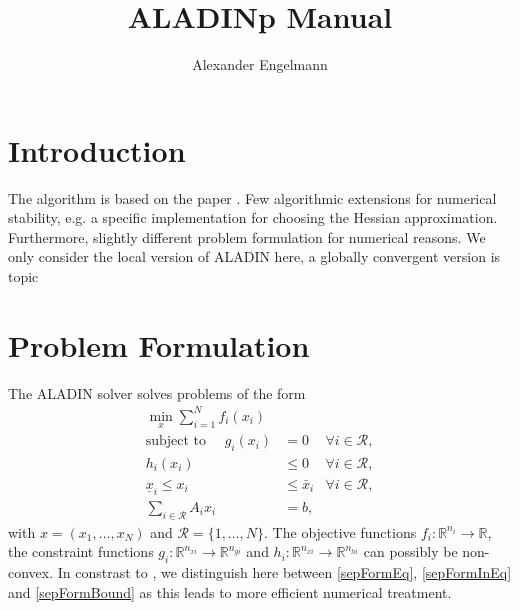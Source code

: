 \documentclass[]{scrartcl}
\title{ALADINp  Manual}
\author{Alexander Engelmann}
\begin{document}
\maketitle

\begin{abstract}

\end{abstract}

\tableofcontents

\section{Introduction}
The algorithm is based on the paper \cite{Houska}.
Few algorithmic extensions for numerical stability, e.g. a specific implementation for choosing the Hessian approximation.
Furthermore, slightly different problem formulation for numerical reasons.
We only consider the local version of ALADIN here, a globally convergent version is topic 

\section{Problem Formulation}
The ALADIN solver solves problems of the form
\begin{subequations} \label{eq:sepForm}
	\begin{align} 
	\min_{x} \sum_{i=1}^N  f_i(x_i)& \\
	\text{subject to }\quad  g_i(x_i)&= 0 &\forall i \in \mathcal{R}, \label{sepFormEq} \\
	h_i(x_i)&\leq 0&\forall i \in \mathcal{R}, \label{sepFormInEq} \\
	\underline x_i \leq x_i& \leq \bar x_i &\forall i \in \mathcal{R}, \label{sepFormBound}\\
	\sum_{i\in \mathcal{R}} A_i x_i&=b \label{eq:consConstr},
	\end{align}
\end{subequations}
with $x=(x_1,\dots,x_N)$ and $\mathcal{R}=\{1,\dots,N\}$.
The objective functions $f_i:\mathbb{R}^{n_i}\rightarrow \mathbb{R}$, the constraint functions $g_i: \mathbb{R}^{n_{xi}} \rightarrow \mathbb{R}^{n_{gi}}$ and $h_i: \mathbb{R}^{n_{xi}} \rightarrow \mathbb{R}^{n_{hi}}$ can possibly be non-convex.
In constrast to \cite{Houska}, we distinguish here between \eqref{sepFormEq}, \eqref{sepFormInEq} and \eqref{sepFormBound} as this leads to more efficient numerical treatment.
\end{document}

